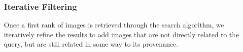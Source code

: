 


\vspace{0.2cm} 
\subsubsection{Iterative Filtering}
\label{sec:prop_iterative_filtering}
Once a first rank of images is retrieved through the search algorithm, we iteratively refine the results to add images that are not directly related to the query, but are still related in some way to its provenance.

